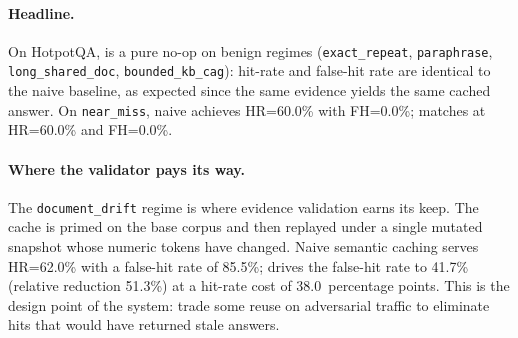 \paragraph{Headline.}
On HotpotQA, \sys{} is a pure no-op on benign regimes (\texttt{exact\_repeat}, \texttt{paraphrase}, \texttt{long\_shared\_doc}, \texttt{bounded\_kb\_cag}): hit-rate and false-hit rate are identical to the naive baseline, as expected since the same evidence yields the same cached answer. On \texttt{near\_miss}, naive achieves HR=60.0\% with FH=0.0\%; \sys{} matches at HR=60.0\% and FH=0.0\%.

\paragraph{Where the validator pays its way.}
The \texttt{document\_drift} regime is where evidence validation earns its keep. The cache is primed on the base corpus and then replayed under a single mutated snapshot whose numeric tokens have changed. Naive semantic caching serves HR=62.0\% with a false-hit rate of 85.5\%; \sys{} drives the false-hit rate to 41.7\% (relative reduction 51.3\%) at a hit-rate cost of 38.0~percentage points. This is the design point of the system: trade some reuse on adversarial traffic to eliminate hits that would have returned stale answers.
